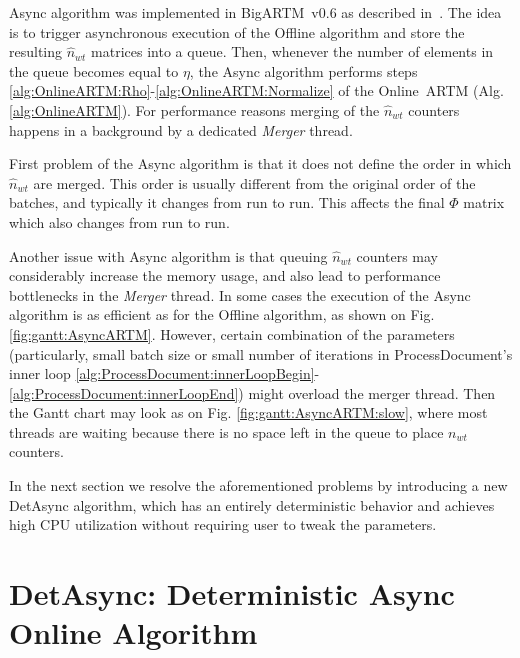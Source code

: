 \documentclass[russian,english]{llncs}
\newcommand{\kw}[1]{\mbox{\textsf{#1}}}
\begin{document}
\kw{Async} algorithm was implemented in \kw{BigARTM v0.6} as described in~\cite{vfardi15aist}.
The idea is to trigger asynchronous execution of the \kw{Offline} algorithm
and store the resulting $\hat n_{wt}$ matrices into a queue.
Then, whenever the number of elements in the queue becomes equal to $\eta$,
the \kw{Async} algorithm performs steps \ref{alg:OnlineARTM:Rho}-\ref{alg:OnlineARTM:Normalize}
of the \kw{Online ARTM} (Alg. \ref{alg:OnlineARTM}).
For performance reasons merging of the $\hat n_{wt}$ counters happens in a background by a dedicated \emph{Merger} thread.

First problem of the \kw{Async} algorithm is that it does not define the order
in which $\hat n_{wt}$ are merged.
This order is usually different from the original order of the batches,
and typically it changes from run to run.
This affects the final $\Phi$ matrix which also changes from run to run.

Another issue with \kw{Async} algorithm is that
queuing $\hat n_{wt}$ counters may considerably increase the memory usage,
and also lead to performance bottlenecks in the \emph{Merger} thread.
In some cases the execution of the \kw{Async} algorithm is
as efficient as for the \kw{Offline} algorithm,
as shown on Fig. \ref{fig:gantt:AsyncARTM}.
However, certain combination of the parameters
(particularly, small batch size or small number of iterations in \kw{ProcessDocument}'s inner loop 
\ref{alg:ProcessDocument:innerLoopBegin}-\ref{alg:ProcessDocument:innerLoopEnd})
might overload the merger thread.
Then the Gantt chart may look as on Fig. \ref{fig:gantt:AsyncARTM:slow},
where most threads are waiting because there is no space left in the queue
to place $n_{wt}$ counters.

In the next section we resolve the aforementioned problems
by introducing a new \kw{DetAsync} algorithm,
which has an entirely deterministic behavior
and achieves high CPU utilization without requiring user to tweak the parameters.

\section{DetAsync: Deterministic Async Online Algorithm}
\label{sec:DetAsyncARTM}
\end{document}
